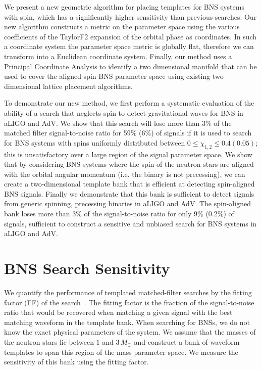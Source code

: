 We present a new geometric algorithm for placing templates for BNS systems
with spin, which has a significantly higher sensitivity than previous
searches.  Our new algorithm constructs a metric on the parameter space using
the various coefficients of the TaylorF2 expansion of the orbital phase as
coordinates. In such a coordinate system the parameter space metric is
globally flat, therefore we can transform into a Euclidean coordinate system.
Finally, our method uses a Principal Coordinate Analysis to identify a two
dimensional manifold that can be used to cover the aligned spin BNS parameter
space using existing two dimensional lattice placement algorithms.

To demonstrate our new method, we first perform a systematic evaluation of the ability
of a search that neglects spin to detect gravitational waves for BNS in aLIGO
and AdV.  We show that this search will lose more than $3\%$ of the
matched filter signal-to-noise ratio for 59\% (6\%) of signals if it is used to search
for BNS systems with spins uniformly distributed between $0 \le \chi_{1,2} \le
0.4 (0.05)$; this is unsatisfactory over a
large region of the signal parameter space. We show that by considering BNS
systems where the spin of the neutron stars are aligned with the orbital
angular momentum (i.e. the binary is not precessing), we can create a
two-dimensional template bank that is efficient at detecting spin-aligned BNS
signals. Finally we demonstrate that this bank is sufficient to detect signals
from generic spinning, precessing binaries in aLIGO and AdV. The spin-aligned
bank loses more than $3\%$ of the signal-to-noise ratio for only 9\% (0.2\%)
of signals, sufficient to construct a sensitive and unbiased search for BNS
systems in aLIGO and AdV.

\section{BNS Search Sensitivity}
\label{ssec:nonspin_performance}
\label{sec:spin_import}

We quantify the performance of templated matched-filter searches by the
fitting factor (FF) of the search~\cite{Apostolatos:1995pj}.  The fitting
factor is the fraction of the signal-to-noise ratio that would be recovered
when matching a given signal with the best matching waveform in the template
bank. When searching for BNSs, we do not know the exact physical parameters of the
system. We assume that the masses of the neutron stars lie between $1$ and
$3\, M_\odot$ and construct a bank of waveform templates to span this
region of the mass parameter space. We measure the sensitivity of this bank 
using the fitting factor.

